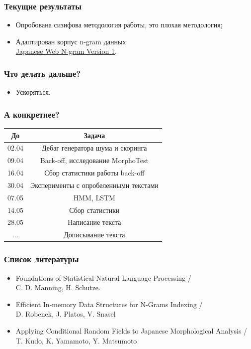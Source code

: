 \documentclass[14pt]{beamer}
\begin{document}
\begin{frame}
\frametitle{Текущие результаты}
\begin{itemize}
    \item Опробована сизифова методология работы,
    это плохая методология;
	
	\item Адаптирован корпус n-gram данных \\ \href{https://catalog.ldc.upenn.edu/LDC2009T08}{Japanese Web N-gram Version 1}.
\end{itemize}
\end{frame}

\begin{frame}
\frametitle{Что делать дальше?}
\begin{itemize}
  \item Ускоряться.
\end{itemize}
\end{frame}

\begin{frame}
	\frametitle{А конкретнее?}
	\begin{tabular}{c|c} \toprule
		До 	& Задача  \\  \midrule
		02.04	& Дебаг генератора шума и скоринга\\
		09.04	& Back-off, исследование MorphoTest\\
		16.04	& Сбор статистики работы back-off\\
		30.04	& Эксперименты с опробеленными текстами\\
		07.05	& HMM, LSTM \\
		14.05	& Сбор статистики \\
		28.05	& Написание текста \\
		... 	& Дописывание текста\\ \bottomrule
	\end{tabular}
\end{frame}

\begin{frame}
\frametitle{Список литературы}
\footnotesize{
\begin{itemize}
  \item Foundations of Statistical Natural Language Processing / \\C. D. Manning, H. Schutze.
  \item Efficient In-memory Data Structures for N-Grams Indexing / \\D. Robenek, J. Platos, V. Snasel
  \item Applying Conditional Random Fields to Japanese Morphological Analysis / T. Kudo, K. Yamamoto, Y. Matsumoto
\end{itemize}}
\end{frame}

\begin{frame}
\end{frame}
\end{document}
